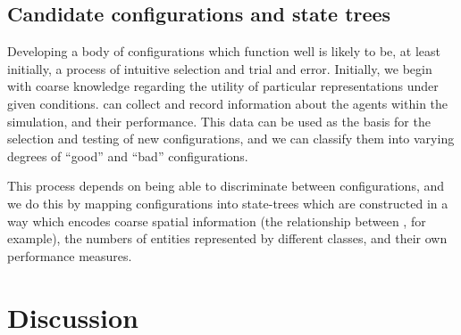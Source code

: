 \subsection{Candidate configurations and state trees}

Developing a body of configurations which function well is likely to
be, at least initially, a process of intuitive selection and trial and
error. Initially, we begin with coarse knowledge regarding the utility
of particular representations under given conditions. \mloggers can
collect and record information about the agents within the simulation,
and their performance. This data can be used as the basis for the
selection and testing of new configurations, and we can classify them
into varying degrees of ``good'' and ``bad'' configurations.

This process depends on being able to discriminate between
configurations, and we do this by mapping configurations into
state-trees which are constructed in a way which encodes coarse
spatial information (the relationship between \mpatches, for example),
the numbers of entities represented by different classes, and their
own performance measures.




\section{Discussion}


